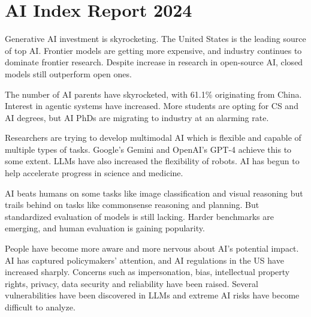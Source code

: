 \documentclass{article}
\begin{document}
\section{AI Index Report 2024}

Generative AI investment is skyrocketing. The United States is the leading
source of top AI. Frontier models are getting more expensive,
and industry continues to dominate frontier research. Despite increase in 
research in open-source AI, closed models still outperform open ones.

The number of AI parents have skyrocketed, with 61.1\% originating from China.
Interest in agentic systems have increased. More students are opting for
CS and AI degrees, but AI PhDs are migrating to industry at an alarming rate.

Researchers are trying to develop multimodal AI which is flexible and capable
of multiple types of tasks. Google's Gemini and OpenAI's GPT-4 achieve this
to some extent. LLMs have also increased the flexibility of robots.
AI has begun to help accelerate progress in science and medicine. 

AI beats humans on some tasks like image classification and visual reasoning but trails
behind on tasks like commonsense reasoning and planning. But standardized evaluation of
models is still lacking. Harder benchmarks are emerging, and human evaluation is gaining
popularity. 

People have become more aware and more nervous about AI's potential impact.
AI has captured policymakers' attention, and AI regulations in the US have
increased sharply. Concerns such as impersonation, bias, intellectual property rights,
privacy, data security and reliability have been raised. Several vulnerabilities
have been discovered in LLMs and extreme AI risks have become difficult to analyze.
\end{document}
